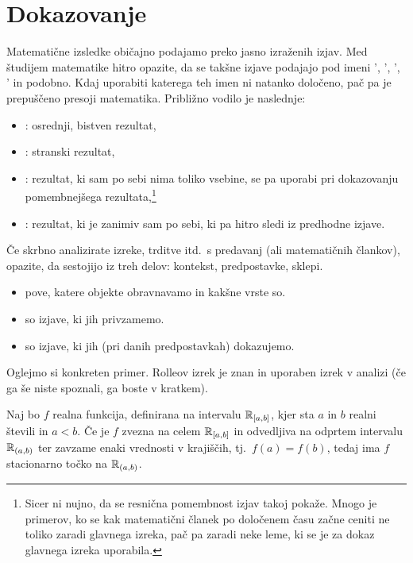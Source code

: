 \chapter{Dokazovanje}\label{POGLAVJE: Dokazovanje}

	Matematične izsledke običajno podajamo preko jasno izraženih izjav. Med študijem matematike hitro opazite, da se takšne izjave podajajo pod imeni ', ', ', ' in podobno. Kdaj uporabiti katerega teh imen ni natanko določeno, pač pa je prepuščeno presoji matematika. Približno vodilo je naslednje:
	\begin{itemize}
		\item
			: osrednji, bistven rezultat,
		\item
			: stranski rezultat,
		\item
			: rezultat, ki sam po sebi nima toliko vsebine, se pa uporabi pri dokazovanju pomembnejšega rezultata,\footnote{Sicer ni nujno, da se resnična pomembnost izjav takoj pokaže. Mnogo je primerov, ko se kak matematični članek po določenem času začne ceniti ne toliko zaradi glavnega izreka, pač pa zaradi neke leme, ki se je za dokaz glavnega izreka uporabila.}
		\item
			: rezultat, ki je zanimiv sam po sebi, ki pa hitro sledi iz predhodne izjave.
	\end{itemize}
	
	Če skrbno analizirate izreke, trditve itd.~s predavanj (ali matematičnih člankov), opazite, da sestojijo iz treh delov: kontekst, predpostavke, sklepi.
	\begin{itemize}
		\item
			 pove, katere objekte obravnavamo in kakšne vrste so.
		\item
			 so izjave, ki jih privzamemo.
		\item
			 so izjave, ki jih (pri danih predpostavkah) dokazujemo.
	\end{itemize}
	
	Oglejmo si konkreten primer. Rolleov izrek je znan in uporaben izrek v analizi (če ga še niste spoznali, ga boste v kratkem).
	
	\begin{izrek}[Rolle]
		Naj bo $f$ realna funkcija, definirana na intervalu ${\mathbb{R}}_{[a, b]}$, kjer sta $a$ in $b$ realni števili in $a < b$. Če je $f$ zvezna na celem ${\mathbb{R}}_{[a, b]}$ in odvedljiva na odprtem intervalu ${\mathbb{R}}_{(a, b)}$ ter zavzame enaki vrednosti v krajiščih, tj.~$f(a) = f(b)$, tedaj ima $f$ stacionarno točko na ${\mathbb{R}}_{(a, b)}$.
	\end{izrek}
	
